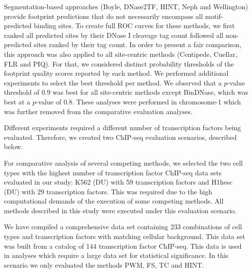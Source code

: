 Segmentation-based approaches (Boyle, DNase2TF, HINT, Neph and Wellington) provide footprint predictions that do not necessarily encompass all motif-predicted binding sites. To create full ROC curves for these methods, we first ranked all predicted sites by their DNase I cleavage tag count followed all non-predicted sites ranked by their tag count. In order to present a fair comparison, this approach was also applied to all site-centric methods (Centipede, Cuellar, FLR and PIQ). For that, we considered distinct probability thresholds of the footprint quality scores reported by each method. We performed additional experiments to select the best threshold per method. We observed that a $p$-value threshold of $0.9$ was best for all site-centric methods except BinDNase, which was best at a $p$-value of $0.8$. These analyses were performed in chromosome-1 which was further removed from the comparative evaluation analyses.

Different experiments required a different number of transcription factors being evaluated. Therefore, we created two ChIP-seq evaluation scenarios, described below.

\vspace{0.3cm}

 For comparative analysis of several competing methods, we selected the two cell types with the highest number of transcription factor ChIP-seq data sets evaluated in our study: K562 (DU) with 59 transcription factors and H1hesc (DU) with 29 transcription factors. This was required due to the high computational demands of the execution of some competing methods. All methods described in this study were executed under this evaluation scenario.

\vspace{0.2cm}

 We have compiled a comprehensive data set containing 233 combinations of cell types and transcription factors with matching cellular background. This data set was built from a catalog of 144 transcription factor ChIP-seq. This data is used in analyses which require a large data set for statistical significance. In this scenario we only evaluated the methods PWM, FS, TC and HINT.

\vspace{0.3cm}

